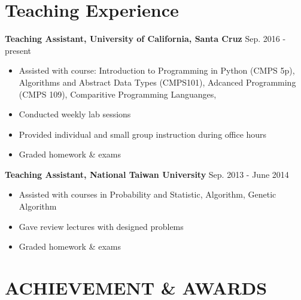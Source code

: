 \documentclass[a4paper,10pt]{article}
\begin{document}
%
%
%



\section{Teaching Experience}
\textbf{Teaching Assistant, University of California, Santa Cruz}  \hfill Sep. 2016 - present
    \begin{itemize}
        \item Assisted with course: Introduction to Programming in Python (CMPS 5p), Algorithms and Abstract Data Types (CMPS101), Adcanced Programming (CMPS 109), Comparitive Programming Languanges,
        \item Conducted weekly lab sessions
        \item Provided individual and small group instruction during office hours
        \item Graded homework \& exams
    \end{itemize}
\textbf{Teaching Assistant, National Taiwan University} \hfill Sep. 2013 - June 2014
    \begin{itemize}
        \item Assisted with courses in Probability and Statistic, Algorithm, Genetic Algorithm
        \item Gave review lectures with designed problems
        \item Graded homework \& exams
    \end{itemize}

\section{ACHIEVEMENT \& AWARDS}
\end{document}
